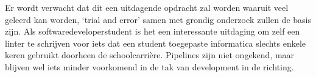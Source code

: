 Er wordt verwacht dat dit een uitdagende opdracht zal worden waaruit veel geleerd kan worden, `trial and error' samen met grondig onderzoek zullen de basis zijn. Als softwaredeveloperstudent is het een interessante uitdaging om zelf een linter te schrijven voor iets dat een student toegepaste informatica slechts enkele keren gebruikt doorheen de schoolcarrière. Pipelines zijn niet ongekend, maar blijven wel iets minder voorkomend in de tak van development in de richting.
